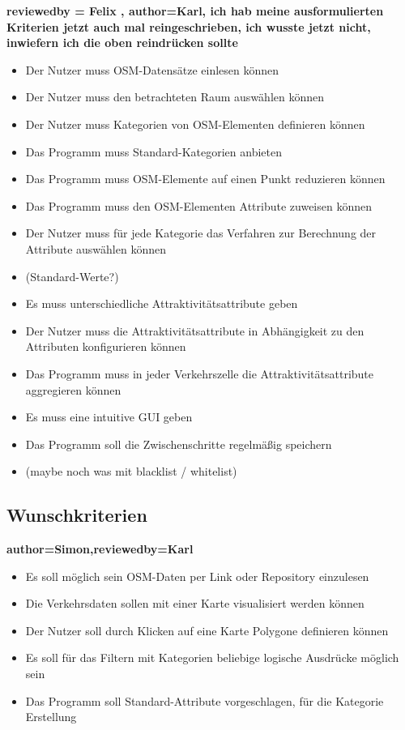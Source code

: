 \documentclass[parskip=full]{scrartcl} %
\begin{document}
\textbf{reviewedby = Felix , author=Karl, ich hab meine ausformulierten Kriterien jetzt auch mal reingeschrieben, ich wusste jetzt nicht, inwiefern ich die oben reindrücken sollte\\}
\begin{itemize}
    \item Der Nutzer muss OSM-Datensätze einlesen können
    \item Der Nutzer muss den betrachteten Raum auswählen können
    \item Der Nutzer muss Kategorien von OSM-Elementen definieren können
    \item Das Programm muss Standard-Kategorien anbieten
    \item Das Programm muss OSM-Elemente auf einen Punkt reduzieren können
    \item Das Programm muss den OSM-Elementen Attribute zuweisen können
    \item Der Nutzer muss für jede Kategorie das Verfahren zur Berechnung der Attribute auswählen können
    \item (Standard-Werte?)
    \item Es muss unterschiedliche Attraktivitätsattribute geben
    \item Der Nutzer muss die Attraktivitätsattribute in Abhängigkeit zu den Attributen konfigurieren können
    \item Das Programm muss in jeder Verkehrszelle die Attraktivitätsattribute aggregieren können
    \item Es muss eine intuitive GUI geben
    \item Das Programm soll die Zwischenschritte regelmäßig speichern
    \item (maybe noch was mit blacklist / whitelist)
\end{itemize}


\subsection{Wunschkriterien}
\textbf{author=Simon,reviewedby=Karl\\}
\begin{itemize}
    \item Es soll möglich sein OSM-Daten per Link oder Repository einzulesen
    \item Die Verkehrsdaten sollen mit einer Karte visualisiert werden können
    \item Der Nutzer soll durch Klicken auf eine Karte Polygone definieren können
    \item Es soll für das Filtern mit Kategorien beliebige logische Ausdrücke möglich sein
    \item Das Programm soll Standard-Attribute vorgeschlagen, für die Kategorie Erstellung
\end{itemize}
\end{document}

